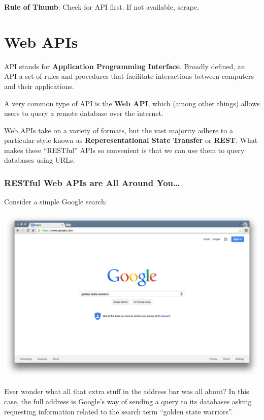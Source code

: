 \documentclass[]{book}
\begin{document}
\textbf{Rule of Thumb}: Check for API first. If not available, scrape.

\hypertarget{web-apis}{\section{Web APIs}\label{web-apis}}

API stands for \textbf{Application Programming Interface}. Broadly
defined, an API a set of rules and procedures that facilitate
interactions between computers and their applications.

A very common type of API is the \textbf{Web API}, which (among other
things) allows users to query a remote database over the internet.

Web APIs take on a variety of formats, but the vast majority adhere to a
particular style known as \textbf{Reperesentational State Transfer} or
\textbf{REST}. What makes these ``RESTful'' APIs so convenient is that
we can use them to query databases using URLs.

\subsubsection*{RESTful Web APIs are All Around
You\ldots{}}\label{restful-web-apis-are-all-around-you}

Consider a simple Google search:

\begin{center}\includegraphics[width=0.7\linewidth]{img/google_search} \end{center}

Ever wonder what all that extra stuff in the address bar was all about?
In this case, the full address is Google's way of sending a query to its
databases asking requesting information related to the search term
``golden state warriors''.
\end{document}
